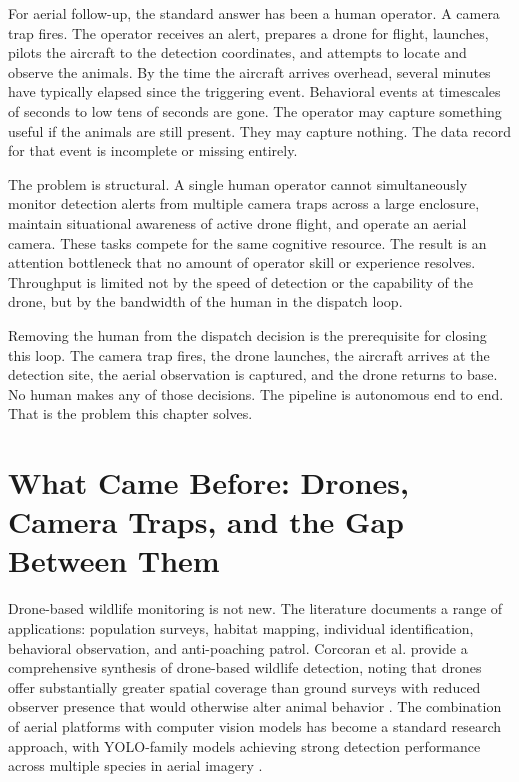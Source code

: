 For aerial follow-up, the standard answer has been a human operator. A camera trap fires. The operator receives an alert, prepares a drone for flight, launches, pilots the aircraft to the detection coordinates, and attempts to locate and observe the animals. By the time the aircraft arrives overhead, several minutes have typically elapsed since the triggering event. Behavioral events at timescales of seconds to low tens of seconds are gone. The operator may capture something useful if the animals are still present. They may capture nothing. The data record for that event is incomplete or missing entirely.

The problem is structural. A single human operator cannot simultaneously monitor detection alerts from multiple camera traps across a large enclosure, maintain situational awareness of active drone flight, and operate an aerial camera. These tasks compete for the same cognitive resource. The result is an attention bottleneck that no amount of operator skill or experience resolves. Throughput is limited not by the speed of detection or the capability of the drone, but by the bandwidth of the human in the dispatch loop.

Removing the human from the dispatch decision is the prerequisite for closing this loop. The camera trap fires, the drone launches, the aircraft arrives at the detection site, the aerial observation is captured, and the drone returns to base. No human makes any of those decisions. The pipeline is autonomous end to end. That is the problem this chapter solves.

\section{What Came Before: Drones, Camera Traps, and the Gap Between Them}
\label{sec:ch4_context}
Drone-based wildlife monitoring is not new. The literature documents a range of applications: population surveys, habitat mapping, individual identification, behavioral observation, and anti-poaching patrol. Corcoran et al. provide a comprehensive synthesis of drone-based wildlife detection, noting that drones offer substantially greater spatial coverage than ground surveys with reduced observer presence that would otherwise alter animal behavior \cite{corcoran2021automated}. The combination of aerial platforms with computer vision models has become a standard research approach, with YOLO-family models achieving strong detection performance across multiple species in aerial imagery \cite{waid2023dataset}.

